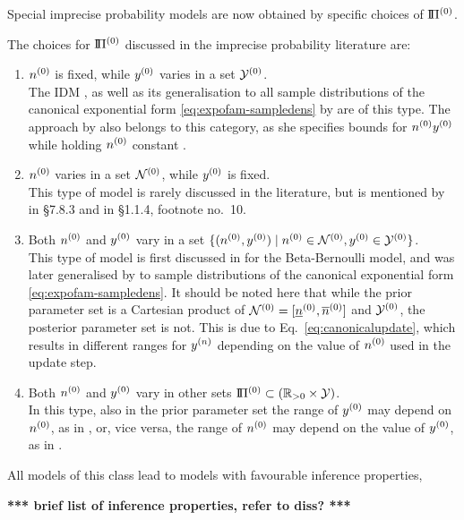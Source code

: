 Special imprecise probability models are now obtained by specific choices of $\text{I}\!\Pi^{(0)}$.

The choices for $\text{I}\!\Pi^{(0)}$ discussed in the imprecise probability literature are:
\begin{enumerate}%
\item $n^{(0)}$ is fixed, while $y^{(0)}$ varies in a set $\mathcal{Y}^{(0)}$.\\
\label{enum:modeltypes-a}%
The IDM \cite{1996:walley::idm},
as well as its generalisation to all sample distributions of the canonical exponential form \eqref{eq:expofam-sampledens}
by \cite{2005:quaeghebeurcooman} are of this type.
The approach by \cite{1997:boratynska} also belongs to this category,
as she specifies bounds for $n^{(0)} y^{(0)}$ while holding $n^{(0)}$ constant \cite[see][p.~1973]{2012:benavolizaffalon}.
\item $n^{(0)}$ varies in a set $\mathcal{N}^{(0)}$, while $y^{(0)}$ is fixed.\\
\label{enum:varyn}%
This type of model is rarely discussed in the literature,
but is mentioned by \cite{1991:walley} in {\S 7.8.3} and in {\S 1.1.4}, footnote no.~10.
\item Both $n^{(0)}$ and $y^{(0)}$ vary in a set $\{ (n^{(0)}, y^{(0)}) \mid n^{(0)} \in \mathcal{N}^{(0)}, y^{(0)} \in \mathcal{Y}^{(0)} \}$.\\
\label{enum:rectangular}%
This type of model is first discussed in \cite[\S 5.4.3]{1991:walley} for the Beta-Bernoulli model,
and was later generalised by \cite{Walter2009a-long}
to sample distributions of the canonical exponential form \eqref{eq:expofam-sampledens}.
It should be noted here that while the prior parameter set is a Cartesian product of $\mathcal{N}^{(0)} = [\underline{n}^{(0)}, \overline{n}^{(0)}]$ and $\mathcal{Y}^{(0)}$,
the posterior parameter set is not.
This is due to Eq.~\eqref{eq:canonicalupdate},
which results in different ranges for $y^{(n)}$ depending on the value of $n^{(0)}$ used in the update step.%
\item Both $n^{(0)}$ and $y^{(0)}$ vary in other sets $\text{I}\!\Pi^{(0)} \subset (\mathbb{R}_{>0} \times \mathcal{Y})$.\\
\label{enum:generalset}%
In this type, also in the prior parameter set the range of $y^{(0)}$ may depend on $n^{(0)}$,
as in \cite[\S 2.3]{Walter2011a},
or, vice versa, the range of $n^{(0)}$ may depend on the value of $y^{(0)}$, as in \cite{2012:benavolizaffalon}.
\end{enumerate}

All models of this class lead to models with favourable inference properties,

\textbf{*** brief list of inference properties, refer to diss? ***}

